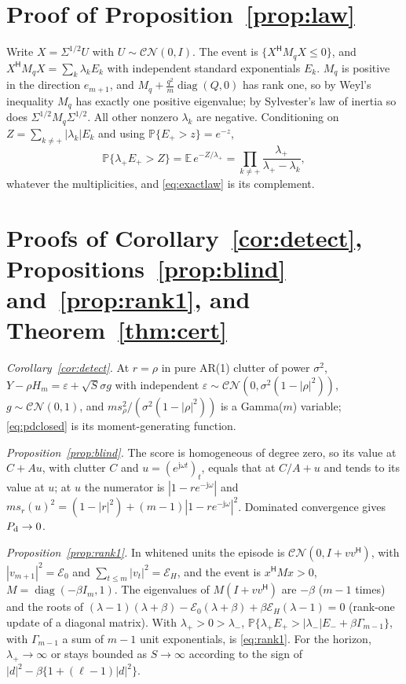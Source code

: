 \documentclass[journal]{IEEEtran}
\newcommand{\PP}{\mathbb{P}}
\begin{document}
\appendices
\section{Proof of Proposition~\ref{prop:law}}\label{app:law}
Write $X=\Sigma^{1/2}U$ with $U\sim\mathcal{CN}(0,I)$. The event is $\{X^{\mathsf H}M_qX\le0\}$, and $X^{\mathsf H}M_qX=\sum_k\lambda_kE_k$ with independent standard exponentials $E_k$. $M_q$ is positive in the direction $e_{m+1}$, and $M_q+\frac{q^2}{m}\operatorname{diag}(Q,0)$ has rank one, so by Weyl's inequality $M_q$ has exactly one positive eigenvalue; by Sylvester's law of inertia so does $\Sigma^{1/2}M_q\Sigma^{1/2}$. All other nonzero $\lambda_k$ are negative. Conditioning on $Z=\sum_{k\ne+}|\lambda_k|E_k$ and using $\PP\{E_+>z\}=e^{-z}$,
\[
\PP\{\lambda_+E_+>Z\}=\mathbb E\,e^{-Z/\lambda_+}=\prod_{k\ne+}\frac{\lambda_+}{\lambda_+-\lambda_k},
\]
whatever the multiplicities, and \eqref{eq:exactlaw} is its complement.

\section{Proofs of Corollary~\ref{cor:detect}, Propositions~\ref{prop:blind} and~\ref{prop:rank1}, and Theorem~\ref{thm:cert}}\label{app:detect}
\emph{Corollary~\ref{cor:detect}.} At $r=\rho$ in pure AR(1) clutter of power $\sigma^2$, $Y-\rho H_m=\varepsilon+\sqrt S\sigma g$ with independent $\varepsilon\sim\mathcal{CN}(0,\sigma^2(1-|\rho|^2))$, $g\sim\mathcal{CN}(0,1)$, and $ms_\rho^2/(\sigma^2(1-|\rho|^2))$ is a Gamma($m$) variable; \eqref{eq:pdclosed} is its moment-generating function.

\emph{Proposition~\ref{prop:blind}.} The score is homogeneous of degree zero, so its value at $C+Au$, with clutter $C$ and $u=(e^{\mathrm j\omega t})_t$, equals that at $C/A+u$ and tends to its value at $u$; at $u$ the numerator is $|1-re^{-\mathrm j\omega}|$ and $ms_r(u)^2=(1-|r|^2)+(m-1)|1-re^{-\mathrm j\omega}|^2$. Dominated convergence gives $P_{\rm d}\to0$.

\emph{Proposition~\ref{prop:rank1}.} In whitened units the episode is $\mathcal{CN}(0,I+vv^{\mathsf H})$, with $|v_{m+1}|^2=\mathcal E_0$ and $\sum_{t\le m}|v_t|^2=\mathcal E_H$, and the event is $x^{\mathsf H}Mx>0$, $M=\operatorname{diag}(-\beta I_m,1)$. The eigenvalues of $M(I+vv^{\mathsf H})$ are $-\beta$ ($m-1$ times) and the roots of $(\lambda-1)(\lambda+\beta)-\mathcal E_0(\lambda+\beta)+\beta\mathcal E_H(\lambda-1)=0$ (rank-one update of a diagonal matrix). With $\lambda_+>0>\lambda_-$, $\PP\{\lambda_+E_+>|\lambda_-|E_-+\beta\Gamma_{m-1}\}$, with $\Gamma_{m-1}$ a sum of $m-1$ unit exponentials, is \eqref{eq:rank1}. For the horizon, $\lambda_+\to\infty$ or stays bounded as $S\to\infty$ according to the sign of $|d|^2-\beta\{1+(\ell-1)|d|^2\}$.
\end{document}
